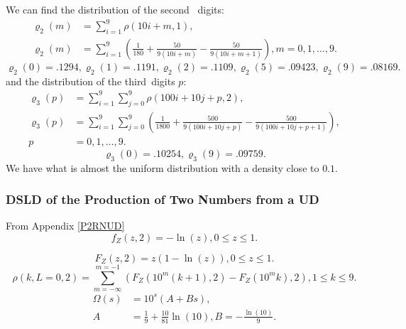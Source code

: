 \documentclass[titlepage,fleqn]{article}%
\begin{document}
We can find the distribution of the second \ digits:%
\begin{align}
\varrho_{2}(m)  &  =%
{\displaystyle\sum\limits_{i=1}^{9}}
\rho(10i+m,1),\nonumber\\
\varrho_{2}(m)  &  =%
{\displaystyle\sum\limits_{i=1}^{9}}
\left(  \frac{1}{180}+\frac{50}{9(10i+m)}-\frac{50}{9(10i+m+1)}\right)
,m=0,1,\ldots,9. \label{2dDig}%
\end{align}%
\[
\varrho_{2}(0)=.1294,\varrho_{2}(1)=.1191,\varrho_{2}(2)=.1109,\varrho
_{2}(5)=.09423,\varrho_{2}(9)=.08169.
\]
and the distribution of the third\ digits $p$:
\begin{align}
\varrho_{3}(p)  &  =%
{\displaystyle\sum\limits_{i=1}^{9}}
{\displaystyle\sum\limits_{j=0}^{9}}
\rho(100i+10j+p,2),\nonumber\\
\varrho_{3}(p)  &  =%
{\displaystyle\sum\limits_{i=1}^{9}}
{\displaystyle\sum\limits_{j=0}^{9}}
\left(  \frac{1}{1800}+\frac{500}{9(100i+10j+p)}-\frac{500}{9(100i+10j+p+1)}%
\right)  ,\label{3dDig}\\
p  &  =0,1,\ldots,9.
\end{align}%
\[
\varrho_{3}(0)=.10254,\varrho_{3}(9)=.09759.
\]
We have what is almost the uniform distribution with a density close to $0.1$.

\subsubsection{DSLD of the Production of Two Numbers from a UD}%

\label{P2NfUD}%


From Appendix
\ref{P2RNUD}%
\[
f_{Z}(z,2)=-\ln(z),0\leq z\leq1.
\]
%

\[
F_{Z}(z,2)=z\left(  1-\ln(z)\right)  ,0\leq z\leq1.
\]%
\[
\rho(k,L=0,2)=%
{\displaystyle\sum\limits_{m=-\infty}^{m=-1}}
\left(  F_{Z}(10^{m}(k+1),2)-F_{Z}(10^{m}k),2\right)  ,1\leq k\leq9.
\]%
\begin{align*}
\Omega(s)  &  =10^{s}\left(  A+Bs\right)  ,\\
A  &  =\frac{1}{9}+\frac{10}{81}\ln(10),B=-\frac{\ln(10)}{9}.
\end{align*}
%
\end{document}
